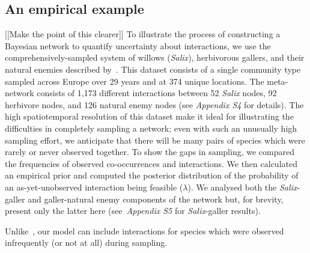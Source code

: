 \documentclass[12pt]{article}
\begin{document}
\begin{spacing}{2.0}
  \subsection*{An empirical example}
    [[Make the point of this clearer]]
      To illustrate the process of constructing a Bayesian network to quantify uncertainty about interactions, we use the comprehensively-sampled system of willows (\emph{Salix}), herbivorous gallers, and their natural enemies described by~\citet{Kopelke2017}. This dataset consists of a single community type sampled across Europe over 29 years and at 374 unique locations. The meta-network consists of 1,173 different interactions between 52 \emph{Salix} nodes, 92 herbivore nodes, and 126 natural enemy nodes (see \emph{Appendix S4} for details). 
      The high spatiotemporal resolution of this dataset make it ideal for illustrating the difficulties in completely sampling a network; even with such an unusually high sampling effort, we anticipate that there will be many pairs of species which were rarely or never observed together. To show the gaps in sampling, we compared the frequencies of observed co-occurrences and interactions. We then calculated an empirical prior and computed the posterior distribution of the probability of an as-yet-unobserved interaction being feasible ($\lambda$).
      We analysed both the \emph{Salix}-galler and galler-natural enemy components of the network but, for brevity, present only the latter here (see~\emph{Appendix S5} for \emph{Salix}-galler results).


      Unlike~\citet{Bartomeus2013,Weinstein2017,Weinstein2017a}, our model can include interactions for species which were observed infrequently (or not at all) during sampling. 


\end{spacing}
\end{document}
